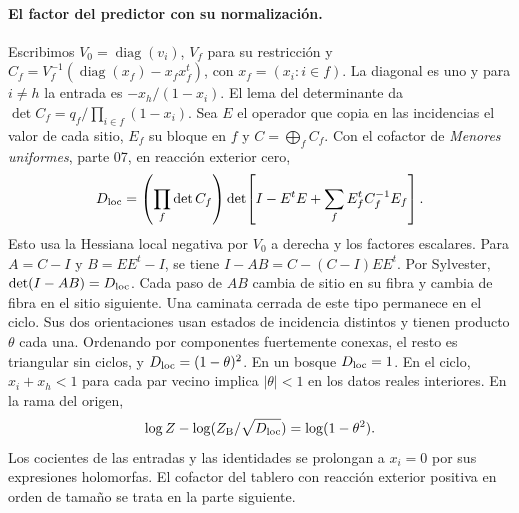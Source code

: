 \paragraph{El factor del predictor con su normalización.}
Escribimos $V_0=\operatorname{diag}(v_i)$, $V_f$ para su restricción y
$C_f=V_f^{-1}(\operatorname{diag}(x_f)-x_fx_f^t)$,
con $x_f=(x_i:i\in f)$. La diagonal es uno y para $i\ne h$ la entrada
es $-x_h/(1-x_i)$. El lema del determinante da
$\det C_f=q_f/\prod_{i\in f}(1-x_i)$. Sea $E$ el operador que copia en las
incidencias el valor de cada sitio, $E_f$ su bloque en $f$ y $C=\bigoplus_f C_f$.
Con el cofactor de \emph{Menores uniformes}, parte 07, en reacción exterior cero,
\[
 D_{\rm loc}
 = \left(\prod_f\det C_f\right)
 \det\!\left[I-E^tE+\sum_f E_f^t C_f^{-1}E_f\right].
\]
Esto usa la Hessiana local negativa por $V_0$ a derecha y los factores escalares.
Para $A=C-I$ y $B=EE^t-I$, se tiene $I-AB=C-(C-I)EE^t$. Por Sylvester,
$\det(I-AB)=D_{\rm loc}$. Cada paso de $AB$ cambia de sitio en su fibra
y cambia de fibra en el sitio siguiente. Una caminata cerrada de este tipo
permanece en el ciclo. Sus dos orientaciones usan estados de incidencia distintos
y tienen producto $\theta$ cada una. Ordenando por componentes fuertemente conexas,
el resto es triangular sin ciclos, y $D_{\rm loc}=(1-\theta)^2$.
En un bosque $D_{\rm loc}=1$. En el ciclo, $x_i+x_h<1$ para cada par vecino
implica $|\theta|<1$ en los datos reales interiores. En la rama del origen,
\[
 \log Z-\log(Z_{\rm B}/\sqrt{D_{\rm loc}})=\log(1-\theta^2).
\]
Los cocientes de las entradas y las identidades se prolongan a $x_i=0$
por sus expresiones holomorfas. El cofactor del tablero con reacción exterior
positiva en orden de tamaño se trata en la parte siguiente.
